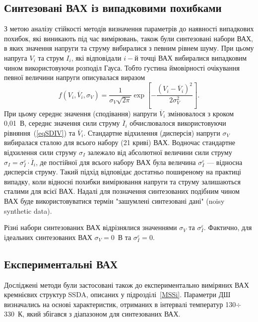 \subsection{Синтезовані ВАХ із випадковими похибками}
З метою аналізу стійкості методів визначення параметрів до наявності випадкових похибок, які виникають під час вимірювань,
також були синтезовані набори ВАХ, в яких значення напруги та струму вибиралися з певним рівнем шуму.
При цьому напруга $V_i$ та струм $I_i$, які відповідали $i-$й точці ВАХ вибиралися випадковим чином використовуючи розподіл Гауса.
Тобто густина ймовірності очікування певної величини напруги описувалася виразом
\begin{equation}
\label{eqGaus}
f(V_i,\overline{V}_i,\sigma_V)=\frac{1}{\sigma_V\sqrt{2\pi}}\exp\left[-\frac{(V_i-\overline{V}_i)^2}{2\sigma_V^2}\right].
\end{equation}
При цьому середнє значення (сподівання) напруги $\overline{V}_i$ змінювалося з кроком 0,01~В,
середнє значення сили струму $\overline{I}_i$ обчислювалося використовуючи рівняння~(\ref{eqSDIV}) та $\overline{V}_i$.
Стандартне відхилення (дисперсія) напруги $\sigma_V$ вибиралася сталою для всього набору (21 криві) ВАХ.
Водночас стандартне відхилення сили струму $\sigma_I$ залежало від абсолютної величини сили струму $\sigma_I=\sigma_I^\varepsilon\cdot\overline{I}_i$,
де постійної для всього набору ВАХ була величина $\sigma_I^\varepsilon$ --- відносна дисперсія струму.
Такий підхід відповідає достатньо поширеному на практиці випадку, коли відносні похибки вимірювання напруги та струму залишаються сталими для всієї ВАХ.
Надалі для позначення синтезованих подібним чином ВАХ буде використовуватися термін "зашумлені синтезовані дані" (noisy synthetic data).

Різні набори синтезованих ВАХ відрізнялися значеннями $\sigma_V$ та $\sigma_I^\varepsilon$.
Фактично, для ідеальних синтезованих ВАХ $\sigma_V=0$~В та $\sigma_I^\varepsilon=0$.


\subsection{Експериментальні ВАХ}
Досліджені методи були застосовані також до експериментально виміряних ВАХ кремнієвих структур SSDA, описаних у підрозділі~\ref{MSSi}.
Параметри ДШ визначались на основі характеристик, отриманих в інтервалі температур 130$\div$330~К, який збігався з діапазоном для синтезованих ВАХ.

